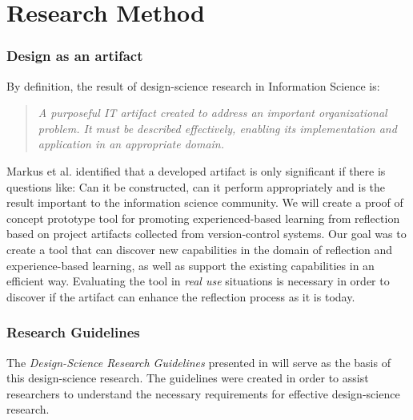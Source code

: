 %
\section{Research Method}
\subsubsection{Design as an artifact}
By definition, the result of design-science research in Information Science is:
\begin{quote}
\emph{A purposeful IT artifact created to address an important organizational problem. It must be described effectively, enabling its implementation and application in an appropriate domain.} \citep{Esearch2004}
\end{quote}
Markus et al.\citep{markusetal} identified that a developed artifact is only significant if there is questions like: Can it be constructed, can it perform appropriately and is the result important to the information science community. 
We will create a proof of concept prototype tool for promoting experienced-based learning from reflection based on project artifacts collected from version-control systems. Our goal was to create a tool that can discover new capabilities in the domain of reflection and experience-based learning, as well as support the existing capabilities in an efficient way. Evaluating the tool in \emph{real use} situations is necessary in order to discover if the artifact can enhance the reflection process as it is today.

\subsubsection{Research Guidelines}
The \emph{Design-Science Research Guidelines} presented in \citep{Esearch2004} will serve as the basis of this design-science research. The guidelines were created in order to assist researchers to understand the necessary requirements for effective design-science research. 

